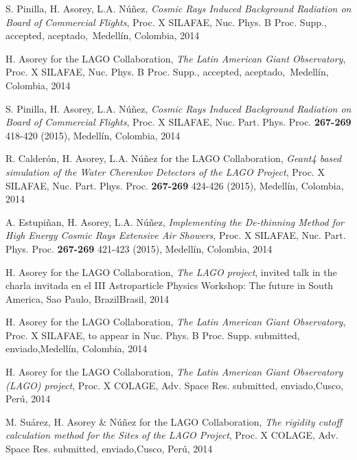 \begin{etaremune}
\item {}S. Pinilla, H. Asorey, L.A. Núñez, {\emph{Cosmic Rays Induced Background Radiation on Board of Commercial Flights}}, \en Proc. X SILAFAE, Nuc. Phys. B Proc. Supp., \ifeng accepted, \else aceptado,\fi\ Medellín, Colombia, 2014

\item {}H. Asorey for the LAGO Collaboration, {\emph{The Latin American Giant Observatory}}, \en Proc. X SILAFAE, Nuc. Phys. B Proc. Supp., \ifeng accepted, \else aceptado,\fi\ Medellín, Colombia, 2014

\item {}S. Pinilla, H. Asorey, L.A. Núñez, {\emph{Cosmic Rays Induced Background Radiation on Board of Commercial Flights}}, \en Proc. X SILAFAE,  Nuc. Part. Phys. Proc. {\bf{267-269}} 418-420 (2015), Medellín, Colombia, 2014

\item {}R. Calderón, H. Asorey, L.A. Núñez for the LAGO Collaboration, {\emph{Geant4 based simulation of the Water Cherenkov Detectors of the LAGO Project}}, \en Proc. X SILAFAE, Nuc. Part. Phys. Proc. {\bf{267-269}} 424-426 (2015), Medellín, Colombia, 2014

\item {}A. Estupiñan, H. Asorey, L.A. Núñez, {\emph{Implementing the De-thinning Method for High Energy Cosmic Rays Extensive Air Showers}}, \en Proc. X SILAFAE, Nuc. Part. Phys. Proc. {\bf{267-269}} 421-423 (2015), Medellín, Colombia, 2014

\item {}H. Asorey for the LAGO Collaboration, {\emph{The LAGO project}}, \ifeng invited talk in the \else charla invitada en el \fi III Astroparticle Physics Workshop: The future in South America, Sao Paulo, \ifeng Brazil\else Brasil\fi, 2014
  
\item {}H. Asorey for the LAGO Collaboration, {\emph{The Latin American Giant Observatory}}, \en Proc. X SILAFAE, to appear in Nuc. Phys. B Proc. Supp. \ifeng submitted, \else enviado,\fi  Medellín, Colombia, 2014

\item {}H. Asorey for the LAGO Collaboration, {\emph{The Latin American Giant Observatory (LAGO) project}}, \en Proc. X COLAGE, Adv. Space Res. \ifeng submitted, \else enviado,\fi  Cusco, Perú, 2014

\item {}M. Suárez, H. Asorey \& Núñez for the LAGO Collaboration, {\emph{The rigidity cutoff calculation method for the Sites of the LAGO Project}}, \en Proc. X COLAGE, Adv. Space Res. \ifeng submitted, \else enviado,\fi  Cusco, Perú, 2014


\end{etaremune}
